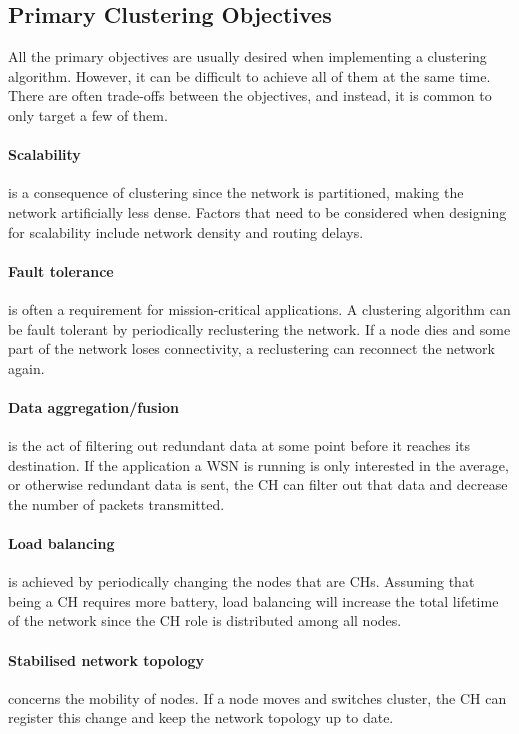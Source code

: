 \subsection{Primary Clustering Objectives}
All the primary objectives are usually desired when implementing a clustering algorithm. However, it can be difficult to achieve all of them at the same time. There are often trade-offs between the objectives, and instead, it is common to only target a few of them.

\paragraph*{Scalability} is a consequence of clustering since the network is partitioned, making the network artificially less dense. Factors that need to be considered when designing for scalability include network density and routing delays.

\paragraph*{Fault tolerance} is often a requirement for mission-critical applications. A clustering algorithm can be fault tolerant by periodically reclustering the network. If a node dies and some part of the network loses connectivity, a reclustering can reconnect the network again.

\paragraph*{Data aggregation/fusion} is the act of filtering out redundant data at some point before it reaches its destination. If the application a WSN is running is only interested in the average, or otherwise redundant data is sent, the CH can filter out that data and decrease the number of packets transmitted.

\paragraph*{Load balancing} is achieved by periodically changing the nodes that are CHs. Assuming that being a CH requires more battery, load balancing will increase the total lifetime of the network since the CH role is distributed among all nodes.

\paragraph*{Stabilised network topology} concerns the mobility of nodes. If a node moves and switches cluster, the CH can register this change and keep the network topology up to date.

